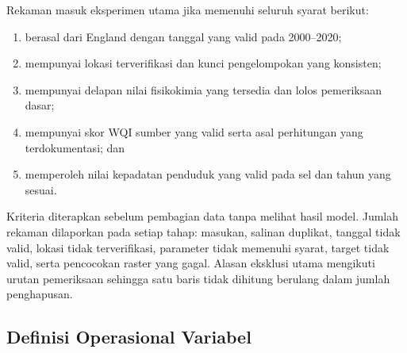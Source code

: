 Rekaman masuk eksperimen utama jika memenuhi seluruh syarat berikut:
\begin{enumerate}
    \item berasal dari England dengan tanggal yang valid pada 2000--2020;
    \item mempunyai lokasi terverifikasi dan kunci pengelompokan yang konsisten;
    \item mempunyai delapan nilai fisikokimia yang tersedia dan lolos pemeriksaan dasar;
    \item mempunyai skor WQI sumber yang valid serta asal perhitungan yang terdokumentasi; dan
    \item memperoleh nilai kepadatan penduduk yang valid pada sel dan tahun yang sesuai.
\end{enumerate}

Kriteria diterapkan sebelum pembagian data tanpa melihat hasil model. Jumlah rekaman dilaporkan pada setiap tahap: masukan, salinan duplikat, tanggal tidak valid, lokasi tidak terverifikasi, parameter tidak memenuhi syarat, target tidak valid, serta pencocokan raster yang gagal. Alasan eksklusi utama mengikuti urutan pemeriksaan sehingga satu baris tidak dihitung berulang dalam jumlah penghapusan.

\subsection{Definisi Operasional Variabel}

